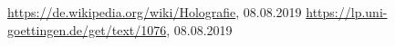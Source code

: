 \begin{thebibliography}{xxx}
		\url{https://de.wikipedia.org/wiki/Holografie},
		08.08.2019
		\url{https://lp.uni-goettingen.de/get/text/1076},
		08.08.2019
\end{thebibliography}
 